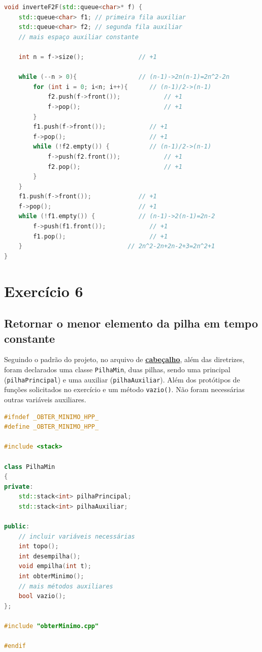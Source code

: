 \documentclass[
  brazilian,
  paper=a4,
  oneside  ,captions=tableheading
]{scrbook}
\newcommand{\passthrough}[1]{#1}
\begin{document}
\begin{lstlisting}[language={C++}]
void inverteF2F(std::queue<char>* f) { 
    std::queue<char> f1; // primeira fila auxiliar 
    std::queue<char> f2; // segunda fila auxiliar 
    // mais espaço auxiliar constante 

    int n = f->size();               // +1

    while (--n > 0){                 // (n-1)->2n(n-1)=2n^2-2n
        for (int i = 0; i<n; i++){      // (n-1)/2->(n-1)
            f2.push(f->front());            // +1
            f->pop();                       // +1
        }
        f1.push(f->front());            // +1
        f->pop();                       // +1
        while (!f2.empty()) {           // (n-1)/2->(n-1)
            f->push(f2.front());            // +1
            f2.pop();                       // +1
        }
    }
    f1.push(f->front());             // +1
    f->pop();                        // +1
    while (!f1.empty()) {            // (n-1)->2(n-1)=2n-2
        f->push(f1.front());            // +1
        f1.pop();                       // +1
    }                             // 2n^2-2n+2n-2+3=2n^2+1
}
\end{lstlisting}

\hypertarget{exercuxedcio-6}{%
\chapter{Exercício 6}\label{exercuxedcio-6}}

\hypertarget{retornar-o-menor-elemento-da-pilha-em-tempo-constante}{%
\section{Retornar o menor elemento da pilha em tempo
constante}\label{retornar-o-menor-elemento-da-pilha-em-tempo-constante}}

Seguindo o padrão do projeto, no arquivo de
\href{https://github.com/ecostadelle/lista_pilhas_filas/blob/main/include/obterMinimo.hpp}{\textbf{cabeçalho}},
além das diretrizes, foram declarados uma classe
\passthrough{\lstinline!PilhaMin!}, duas pilhas, sendo uma principal
(\passthrough{\lstinline!pilhaPrincipal!}) e uma auxiliar
(\passthrough{\lstinline!pilhaAuxiliar!}). Além dos protótipos de
funções solicitados no exercício e um método
\passthrough{\lstinline!vazio()!}. Não foram necessárias outras
variáveis auxiliares.

\begin{lstlisting}[language={C++}]
#ifndef _OBTER_MINIMO_HPP_
#define _OBTER_MINIMO_HPP_

#include <stack>

class PilhaMin
{
private:
    std::stack<int> pilhaPrincipal;
    std::stack<int> pilhaAuxiliar;

public:
    // incluir variáveis necessárias
    int topo();
    int desempilha();
    void empilha(int t);
    int obterMinimo();
    // mais métodos auxiliares
    bool vazio();
};

#include "obterMinimo.cpp"

#endif
\end{lstlisting}
\end{document}
